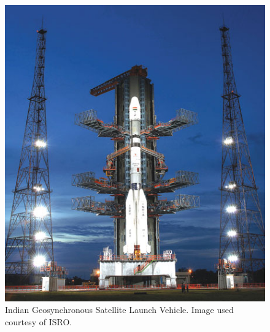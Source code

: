 \begin{figure} [h]
  \begin{center}
    \includegraphics[scale=0.50]{Images/GSLV2.jpg}
  \end{center}
  \caption{Indian Geosynchronous Satellite Launch Vehicle. Image used courtesy of ISRO.}
  \label{fig:GSLV}
\end{figure}